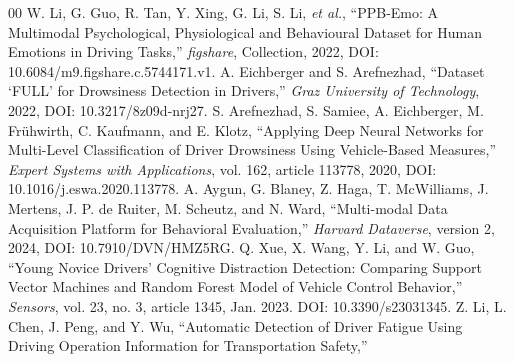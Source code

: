 \documentclass[letterpaper, 10 pt, conference]{ieeeconf}  %
\begin{document}
\begin{thebibliography}{00}
 W. Li, G. Guo, R. Tan, Y. Xing, G. Li, S. Li, \textit{et al.},  
    ``PPB-Emo: A Multimodal Psychological, Physiological and Behavioural Dataset for Human Emotions in Driving Tasks,''  
    \textit{figshare}, Collection, 2022, DOI: 10.6084/m9.figshare.c.5744171.v1. 
 A. Eichberger and S. Arefnezhad,  
    ``Dataset `FULL' for Drowsiness Detection in Drivers,'' 
    \textit{Graz University of Technology}, 2022, DOI: 10.3217/8z09d-nrj27. 
 S. Arefnezhad, S. Samiee, A. Eichberger, M. Frühwirth, C. Kaufmann, and E. Klotz,  
    ``Applying Deep Neural Networks for Multi-Level Classification of Driver Drowsiness Using Vehicle-Based Measures,''  
    \textit{Expert Systems with Applications}, vol. 162, article 113778, 2020, DOI: 10.1016/j.eswa.2020.113778.
 A. Aygun, G. Blaney, Z. Haga, T. McWilliams, J. Mertens, J. P. de Ruiter, M. Scheutz, and N. Ward, 
    ``Multi-modal Data Acquisition Platform for Behavioral Evaluation,''  
    \textit{Harvard Dataverse}, version 2, 2024, DOI: 10.7910/DVN/HMZ5RG. 
 Q. Xue, X. Wang, Y. Li, and W. Guo,  
    ``Young Novice Drivers’ Cognitive Distraction Detection: Comparing Support Vector Machines and Random Forest Model of Vehicle Control Behavior,''  
    \textit{Sensors}, vol. 23, no. 3, article 1345, Jan. 2023. DOI: 10.3390/s23031345.
 Z. Li, L. Chen, J. Peng, and Y. Wu,  
    ``Automatic Detection of Driver Fatigue Using Driving Operation Information for Transportation Safety,''  

\end{thebibliography}
\end{document}
